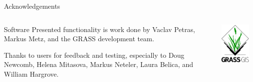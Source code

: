 \documentclass[xcolor={dvipsnames,usenames},beamer,aspectratio=169]{beamer}
\begin{document}
\begin{frame}{Acknowledgements}

\begin{columns}
\begin{column}{0.6\textwidth}

\begin{block}{Software}
Presented functionality is work done by Vaclav Petras, Markus Metz, and the GRASS development team.

\bigskip

Thanks to users for feedback and testing, especially to
Doug Newcomb, Helena Mitasova, Markus Neteler, Laura Belica, and William Hargrove.
\end{block}

\end{column}
\begin{column}{0.3\textwidth}

\begin{center}
  \includegraphics[width=\textwidth]{logos/grass_gis}
\end{center}

\end{column}
\end{columns}

\end{frame}
\end{document}
